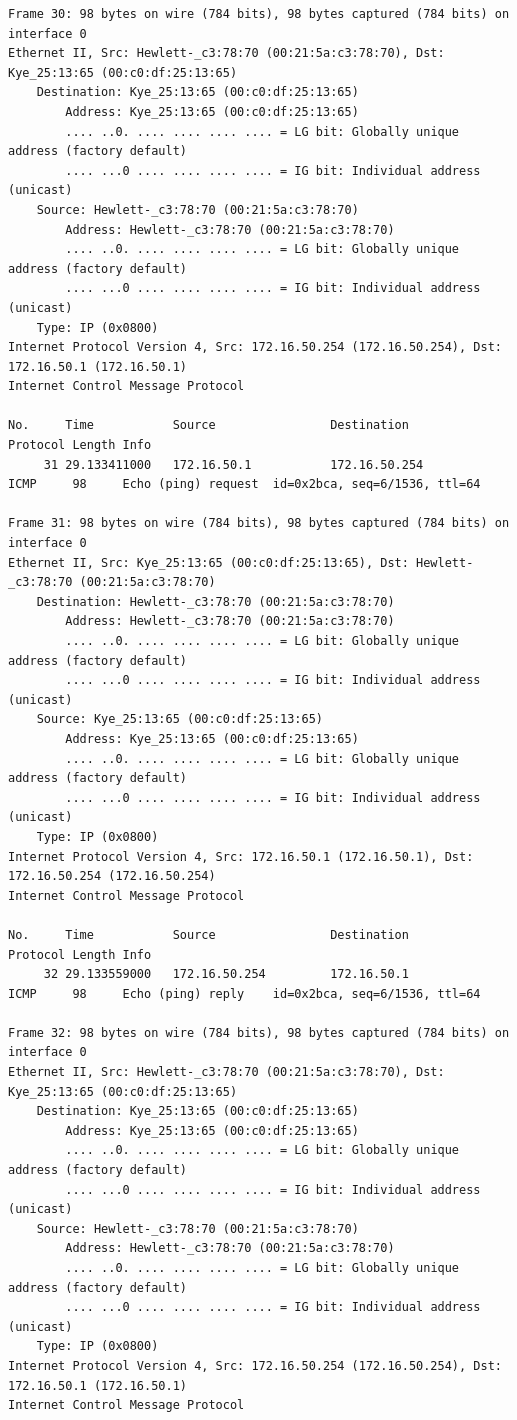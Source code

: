 \documentclass[a4paper,11pt]{article}
\begin{document}
\begin{lstlisting}
Frame 30: 98 bytes on wire (784 bits), 98 bytes captured (784 bits) on interface 0
Ethernet II, Src: Hewlett-_c3:78:70 (00:21:5a:c3:78:70), Dst: Kye_25:13:65 (00:c0:df:25:13:65)
    Destination: Kye_25:13:65 (00:c0:df:25:13:65)
        Address: Kye_25:13:65 (00:c0:df:25:13:65)
        .... ..0. .... .... .... .... = LG bit: Globally unique address (factory default)
        .... ...0 .... .... .... .... = IG bit: Individual address (unicast)
    Source: Hewlett-_c3:78:70 (00:21:5a:c3:78:70)
        Address: Hewlett-_c3:78:70 (00:21:5a:c3:78:70)
        .... ..0. .... .... .... .... = LG bit: Globally unique address (factory default)
        .... ...0 .... .... .... .... = IG bit: Individual address (unicast)
    Type: IP (0x0800)
Internet Protocol Version 4, Src: 172.16.50.254 (172.16.50.254), Dst: 172.16.50.1 (172.16.50.1)
Internet Control Message Protocol

No.     Time           Source                Destination           Protocol Length Info
     31 29.133411000   172.16.50.1           172.16.50.254         ICMP     98     Echo (ping) request  id=0x2bca, seq=6/1536, ttl=64

Frame 31: 98 bytes on wire (784 bits), 98 bytes captured (784 bits) on interface 0
Ethernet II, Src: Kye_25:13:65 (00:c0:df:25:13:65), Dst: Hewlett-_c3:78:70 (00:21:5a:c3:78:70)
    Destination: Hewlett-_c3:78:70 (00:21:5a:c3:78:70)
        Address: Hewlett-_c3:78:70 (00:21:5a:c3:78:70)
        .... ..0. .... .... .... .... = LG bit: Globally unique address (factory default)
        .... ...0 .... .... .... .... = IG bit: Individual address (unicast)
    Source: Kye_25:13:65 (00:c0:df:25:13:65)
        Address: Kye_25:13:65 (00:c0:df:25:13:65)
        .... ..0. .... .... .... .... = LG bit: Globally unique address (factory default)
        .... ...0 .... .... .... .... = IG bit: Individual address (unicast)
    Type: IP (0x0800)
Internet Protocol Version 4, Src: 172.16.50.1 (172.16.50.1), Dst: 172.16.50.254 (172.16.50.254)
Internet Control Message Protocol

No.     Time           Source                Destination           Protocol Length Info
     32 29.133559000   172.16.50.254         172.16.50.1           ICMP     98     Echo (ping) reply    id=0x2bca, seq=6/1536, ttl=64

Frame 32: 98 bytes on wire (784 bits), 98 bytes captured (784 bits) on interface 0
Ethernet II, Src: Hewlett-_c3:78:70 (00:21:5a:c3:78:70), Dst: Kye_25:13:65 (00:c0:df:25:13:65)
    Destination: Kye_25:13:65 (00:c0:df:25:13:65)
        Address: Kye_25:13:65 (00:c0:df:25:13:65)
        .... ..0. .... .... .... .... = LG bit: Globally unique address (factory default)
        .... ...0 .... .... .... .... = IG bit: Individual address (unicast)
    Source: Hewlett-_c3:78:70 (00:21:5a:c3:78:70)
        Address: Hewlett-_c3:78:70 (00:21:5a:c3:78:70)
        .... ..0. .... .... .... .... = LG bit: Globally unique address (factory default)
        .... ...0 .... .... .... .... = IG bit: Individual address (unicast)
    Type: IP (0x0800)
Internet Protocol Version 4, Src: 172.16.50.254 (172.16.50.254), Dst: 172.16.50.1 (172.16.50.1)
Internet Control Message Protocol


\end{lstlisting}
\end{document}
